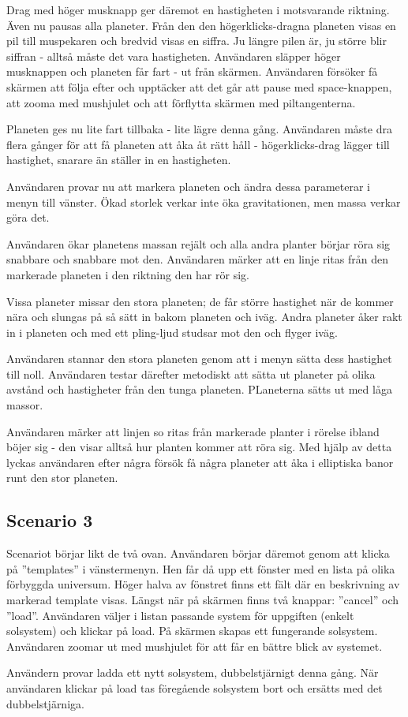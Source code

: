 Drag med höger musknapp ger däremot en hastigheten i motsvarande riktning.
Även nu pausas alla planeter.
Från den den högerklicks-dragna planeten visas en pil till muspekaren
och bredvid visas en siffra.
Ju längre pilen är, ju större blir siffran - alltså måste det vara hastigheten.
Användaren släpper höger musknappen och planeten får fart - ut från skärmen.
Användaren försöker få skärmen att följa efter och
upptäcker att det går att pause med space-knappen,
att zooma med mushjulet och att förflytta skärmen med piltangenterna.

Planeten ges nu lite fart tillbaka - lite lägre denna gång.
Användaren måste dra flera gånger för att få planeten att
åka åt rätt håll - högerklicks-drag lägger till hastighet,
snarare än ställer in en hastigheten.

Användaren provar nu att markera planeten och 
ändra dessa parameterar i menyn till vänster.
Ökad storlek verkar inte öka gravitationen,
men massa verkar göra det.

Användaren ökar planetens massan rejält och alla andra planter börjar
röra sig snabbare och snabbare mot den.
Användaren märker att en linje ritas från den markerade planeten
i den riktning den har rör sig.

Vissa planeter missar den stora planeten; de får större hastighet när
de kommer nära och slungas på så sätt in bakom planeten och iväg.
Andra planeter åker rakt in i planeten och med ett pling-ljud
studsar mot den och flyger iväg.

Användaren stannar den stora planeten genom att i menyn
sätta dess hastighet till noll.
Användaren testar därefter metodiskt att sätta ut planeter på olika avstånd
och hastigheter från den tunga planeten.
PLaneterna sätts ut med låga massor.

Användaren märker att linjen so ritas från markerade planter i rörelse
ibland böjer sig - den visar alltså hur planten kommer att röra sig.
Med hjälp av detta lyckas användaren efter några försök
få några planeter att åka i elliptiska banor runt den stor planeten.


\subsection{Scenario 3}

Scenariot börjar likt de två ovan.
Användaren börjar däremot genom att klicka på ''templates'' i vänstermenyn.
Hen får då upp ett fönster med en lista på olika förbyggda universum.
Höger halva av fönstret finns ett fält där en beskrivning av markerad
template visas.
Längst när på skärmen finns två knappar: ''cancel'' och ''load''.
Användaren väljer i listan passande system för uppgiften
(enkelt solsystem) och klickar på load.
På skärmen skapas ett fungerande solsystem.
Användaren zoomar ut med mushjulet för att får en bättre blick av systemet.

Användern provar ladda ett nytt solsystem, dubbelstjärnigt denna gång.
När användaren klickar på load tas föregående solsystem bort och
ersätts med det dubbelstjärniga.

